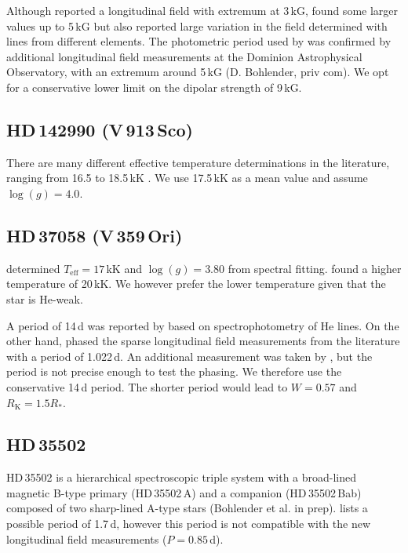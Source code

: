 \documentclass[useAMS,usenatbib]{mn2e}
\newcommand{\rk}{R_\mathrm{K}}
\newcommand{\rs}{R_\ast}
\begin{document}
Although \citet{2005A&A...430.1143B} reported a longitudinal field with extremum at 3\,kG, \citet{2011AN....332..974Y} found some larger values up to 5\,kG but also reported large variation in the field determined with lines from different elements. 
The photometric period used by \citet{2005A&A...430.1143B} was confirmed by additional longitudinal field measurements at the Dominion Astrophysical Observatory, with an extremum around 5\,kG (D. Bohlender, priv com).
We opt for a conservative lower limit on the dipolar strength of 9\,kG. 

\setcounter{subsection}{54}	
\subsection{HD\,142990 (V\,913\,Sco)}

There are many different effective temperature determinations in the literature, ranging from 16.5 to 18.5\,kK \citep[e.g.][]{2007A&A...468..263C}. We use 17.5\,kK as a mean value and assume $\log(g)=4.0$.

\setcounter{subsection}{55}	
\subsection{HD\,37058 (V\,359\,Ori)}

\citet{2007AstBu..62..319G} determined $T_\mathrm{eff}=17$\,kK and $\log(g)=3.80$ from spectral fitting. 
\citet{2007A&A...470..685L} found a higher temperature of 20\,kK. 
We however prefer the lower temperature given that the star is He-weak. 

A period of 14\,d was reported by \citet{1979A&AS...35..313P} based on spectrophotometry of He lines. On the other hand, \citet{2005A&A...430.1143B} phased the sparse longitudinal field measurements from the literature with a period of 1.022\,d. An additional measurement was taken by \citet{2006A&A...450..777B}, but the period is not precise enough to test the phasing. We therefore use the conservative 14\,d period. The shorter period would lead to $W=0.57$ and $\rk=1.5\rs$. 

\setcounter{subsection}{56}	
\subsection{HD\,35502}

HD\,35502 is a hierarchical spectroscopic triple system with a broad-lined magnetic B-type primary (HD\,35502\,A) and a companion (HD\,35502\,Bab) composed of two sharp-lined A-type stars (Bohlender et al. in prep).
\citet{1981ApJ...249L..39B} lists a possible period of 1.7\,d, however this period is not compatible with the new longitudinal field measurements ($P=0.85$\,d).
\end{document}

